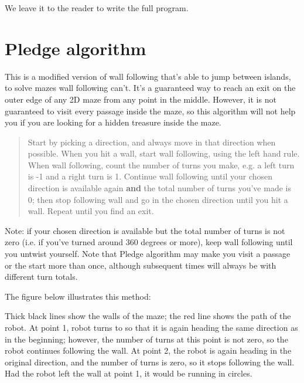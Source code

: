\documentclass[oneside]{stml-l}
\numberwithin{figure}{chapter}
\begin{document}
We leave it to the reader to write the full program.

 \section{Pledge algorithm}
This is a modified version of wall following that's able to
jump between islands, to solve mazes wall following can't.
It's a guaranteed way to reach an exit on the outer edge
of any 2D maze from any point in the middle.  However,
it is not guaranteed to visit every passage inside the maze,
so this algorithm will not help you if you are looking
for a hidden treasure inside the maze.

\begin{quote}
Start by picking a direction, and always move in that
direction when possible. When you  hit a wall, start wall
following, using the left hand rule.  When wall following,
count the number of turns you make, e.g. a left turn is -1
 and a right turn is 1. Continue wall following until your
 chosen direction is available again {\bf and} the total
 number of turns you've made is 0; then stop following wall
 and go in the chosen direction until you hit a wall. Repeat
 until you find an exit.
\end{quote}

Note: if your chosen direction is available but  the total
number of turns is not zero (i.e. if you've turned around 360
degrees or more), keep wall following until you untwist yourself.
Note that Pledge algorithm may make you visit a passage or the
start more than once, although subsequent times will always be
with different turn totals.

The figure below illustrates this method:


Thick black lines show the walls of the maze; the red line shows
the path of the robot. At point 1, robot turns to so that it is
again heading the same direction as in the beginning; however, the
number of turns at this point is not zero, so the robot continues
following the wall. At point 2, the robot is again heading in the
original direction, and the number of turns is zero, so it stops
following the wall. Had the robot left the wall at point 1, it would
be running in circles.
\end{document}
